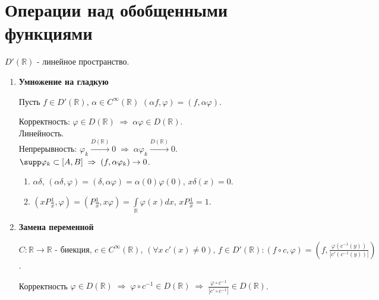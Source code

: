 \newcommand{\loc}{\mathrm{loc}}
\section{Операции над обобщенными функциями}
$D' (\mathbb{R})$ - линейное пространство.\\
\begin{enumerate}
  \item \textbf{Умножение на гладкую}\\
    \begin{definition}
      Пусть $f \in D' (\mathbb{R})$, $\alpha \in C^{\infty} (\mathbb{R})$ $(\alpha f, \varphi) = (f, \alpha \varphi)$.
    \end{definition}
      Корректность: $\varphi \in D (\mathbb{R}) \; \Rightarrow \; \alpha \varphi \in D (\mathbb{R})$.\\
      Линейность.\\
      Непрерывность: $\varphi_{k} \xrightarrow{D (\mathbb{R})} 0 \; \Rightarrow \; \alpha \varphi_{k} \xrightarrow{D (\mathbb{R})} 0$. $\supp \varphi_{k} \subset [A, B] \; \Rightarrow \; (f, \alpha \varphi_{k}) \rightarrow 0$.\\
    \begin{example}
      \begin{enumerate}
        \item $\alpha \delta$, $(\alpha \delta, \varphi) = (\delta, \alpha \varphi) = \alpha(0) \varphi(0)$, $x \delta (x) = 0$.
        \item $\left(x P\frac{1}{x}, \varphi\right) = \left(P\frac{1}{x}, x \varphi\right) = \int\limits_{\mathbb{R}} \varphi(x) d x$, $x P\frac{1}{x} = 1$.
      \end{enumerate}
    \end{example}
  \item \textbf{Замена переменной}\\
    \begin{definition}
      $C \colon \mathbb{R} \rightarrow \mathbb{R} \text{ - биекция, } c \in C^{\infty} (\mathbb{R}) \text{, } (\forall x \ c'(x) \neq 0) \text{, } f \in D' (\mathbb{R}) \colon (f \circ c, \varphi) = \left(f, \frac{\varphi \left(c^{- 1} (y)\right)}{\left|c' \left(c^{- 1} (y)\right)\right|}\right)$.
    \end{definition}
    Корректность $\varphi \in D (\mathbb{R}) \; \Rightarrow \; \varphi \circ c^{- 1} \in D (\mathbb{R}) \; \Rightarrow \; \frac{\varphi \circ c^{- 1}}{\left|c' \circ c^{- 1}\right|} \in D (\mathbb{R})$.\\

\end{enumerate}
